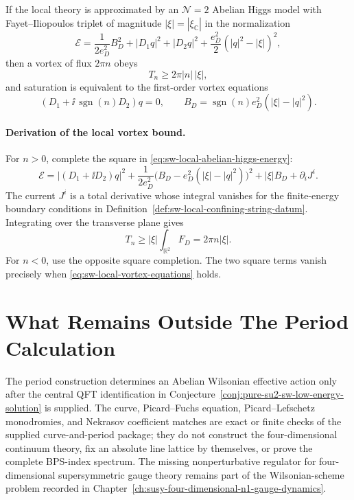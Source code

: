 \begin{controlledapproximation}
\label{ca:sw-local-bps-vortex-tension}
If the local theory is approximated by an \(\mathcal N=2\) Abelian Higgs model
with Fayet--Iliopoulos triplet of magnitude
\(|\xi|=|\xi_{\mathbb C}|\) in the normalization
\begin{equation}
  \mathcal E
  =
  \frac{1}{2e_D^2}B_D^2+|D_1q|^2+|D_2q|^2
  +\frac{e_D^2}{2}(|q|^2-|\xi|)^2 ,
  \label{eq:sw-local-abelian-higgs-energy}
\end{equation}
then a vortex of flux \(2\pi n\) obeys
\begin{equation}
  T_n\ge 2\pi |n|\,|\xi|,
  \label{eq:sw-local-vortex-bound}
\end{equation}
and saturation is equivalent to the first-order vortex equations
\begin{equation}
  (D_1+\ii\,\operatorname{sgn}(n)D_2)q=0,
  \qquad
  B_D=\operatorname{sgn}(n)e_D^2(|\xi|-|q|^2).
  \label{eq:sw-local-vortex-equations}
\end{equation}
\end{controlledapproximation}

\paragraph{Derivation of the local vortex bound.}
For \(n>0\), complete the square in
\eqref{eq:sw-local-abelian-higgs-energy}:
\[
  \mathcal E
  =
  |(D_1+\ii D_2)q|^2
  +
  \frac{1}{2e_D^2}
  \bigl(B_D-e_D^2(|\xi|-|q|^2)\bigr)^2
  +
  |\xi|B_D
  +
  \partial_i J^i .
\]
The current \(J^i\) is a total derivative whose integral vanishes for the
finite-energy boundary conditions in
Definition~\ref{def:sw-local-confining-string-datum}.  Integrating over the
transverse plane gives
\[
  T_n\ge |\xi|\int_{\mathbb R^2}F_D=2\pi n|\xi|.
\]
For \(n<0\), use the opposite square completion.  The two square terms vanish
precisely when \eqref{eq:sw-local-vortex-equations} holds.

\section{What Remains Outside The Period Calculation}

The period construction determines an Abelian Wilsonian effective action only
after the central QFT identification in
Conjecture~\ref{conj:pure-su2-sw-low-energy-solution} is supplied.  The curve,
Picard--Fuchs equation, Picard--Lefschetz monodromies, and Nekrasov coefficient
matches are exact or finite checks of the supplied curve-and-period package;
they do not construct the four-dimensional continuum theory, fix an absolute
line lattice by themselves, or prove the complete BPS-index spectrum.  The missing
nonperturbative regulator for four-dimensional supersymmetric gauge theory
remains part of the Wilsonian-scheme problem recorded in
Chapter~\ref{ch:susy-four-dimensional-n1-gauge-dynamics}.

